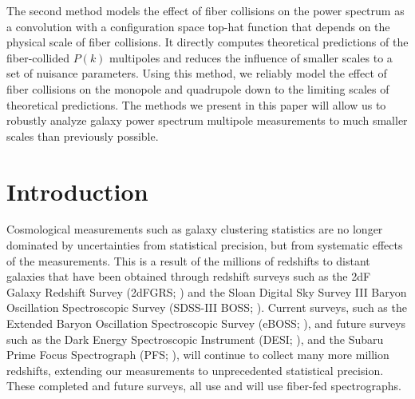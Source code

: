 \qquad The second method models the effect of fiber collisions on the power spectrum as a convolution with a configuration space top-hat function that depends on the physical scale of fiber collisions. It directly computes theoretical predictions of the fiber-collided $P(k)$ multipoles and reduces the influence of smaller scales to a set of nuisance parameters. Using this method, we reliably model the effect of fiber collisions on the monopole and quadrupole down to the limiting scales of theoretical predictions. The methods we present in this paper will allow us to robustly analyze galaxy power spectrum multipole measurements to much smaller scales than previously possible.


\section{Introduction} 
Cosmological measurements such as galaxy clustering statistics are
no longer dominated by uncertainties from statistical precision, but from 
systematic effects of the measurements. This is a result of the millions of 
redshifts to distant galaxies that have been obtained through redshift surveys
such as the 2dF Galaxy Redshift Survey (2dFGRS; \citealt{Colless:1999aa}) and 
the Sloan Digital Sky Survey III Baryon Oscillation Spectroscopic Survey 
(SDSS-III BOSS; \citealt{Anderson:2012aa, Dawson:2013aa}). Current surveys, 
such as the Extended Baryon Oscillation Spectroscopic Survey (eBOSS; \citealt{Dawson:2015aa}), 
and future surveys such as the Dark Energy Spectroscopic Instrument (DESI; \citealt{Schlegel:2011aa, 
Morales:2012aa, Makarem:2014aa}), and the Subaru Prime Focus Spectrograph 
(PFS; \citealt{Takada:2014aa}), 
will continue to collect many more million redshifts, extending our measurements 
to unprecedented statistical precision. These completed and future surveys, all use 
and will use fiber-fed spectrographs. 


